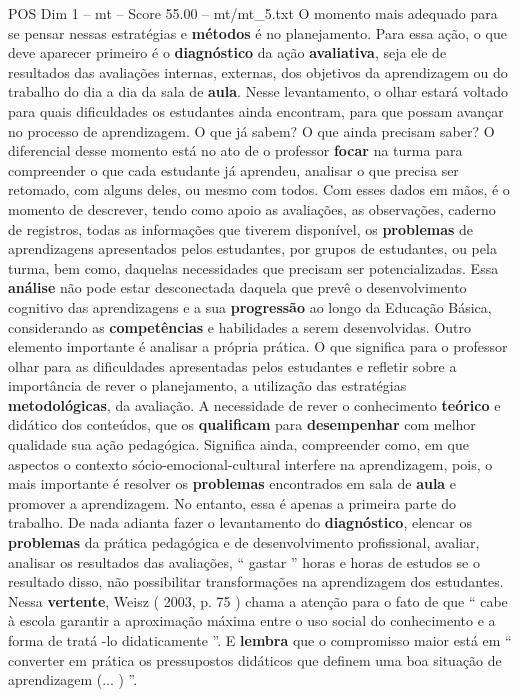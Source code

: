 \begin{textsample}{POS Dim 1 – mt – Score 55.00 – mt/mt\_5.txt}
O momento mais adequado para se pensar nessas estratégias e \textbf{métodos} é no planejamento.
Para essa ação, o que deve aparecer primeiro é o \textbf{diagnóstico} da ação \textbf{avaliativa}, seja ele de resultados das avaliações internas, externas, dos objetivos da aprendizagem ou do trabalho do dia a dia da sala de \textbf{aula}.
Nesse levantamento, o olhar estará voltado para quais dificuldades os estudantes ainda encontram, para que possam avançar no processo de aprendizagem.
O que já sabem?
O que ainda precisam saber?
O diferencial desse momento está no ato de o professor \textbf{focar} na turma para compreender o que cada estudante já aprendeu, analisar o que precisa ser retomado, com alguns deles, ou mesmo com todos.
Com esses dados em mãos, é o momento de descrever, tendo como apoio as avaliações, as observações, caderno de registros, todas as informações que tiverem disponível, os \textbf{problemas} de aprendizagens apresentados pelos estudantes, por grupos de estudantes, ou pela turma, bem como, daquelas necessidades que precisam ser potencializadas.
Essa \textbf{análise} não pode estar desconectada daquela que prevê o desenvolvimento cognitivo das aprendizagens e a sua \textbf{progressão} ao longo da Educação Básica, considerando as \textbf{competências} e habilidades a serem desenvolvidas.
Outro elemento importante é analisar a própria prática.
O que significa para o professor olhar para as dificuldades apresentadas pelos estudantes e refletir sobre a importância de rever o planejamento, a utilização das estratégias \textbf{metodológicas}, da avaliação.
A necessidade de rever o conhecimento \textbf{teórico} e didático dos conteúdos, que os \textbf{qualificam} para \textbf{desempenhar} com melhor qualidade sua ação pedagógica.
Significa ainda, compreender como, em que aspectos o contexto sócio-emocional-cultural interfere na aprendizagem, pois, o mais importante é resolver os \textbf{problemas} encontrados em sala de \textbf{aula} e promover a aprendizagem.
No entanto, essa é apenas a primeira parte do trabalho.
De nada adianta fazer o levantamento do \textbf{diagnóstico}, elencar os \textbf{problemas} da prática pedagógica e de desenvolvimento profissional, avaliar, analisar os resultados das avaliações, “ gastar ” horas e horas de estudos se o resultado disso, não possibilitar transformações na aprendizagem dos estudantes.
Nessa \textbf{vertente}, Weisz ( 2003, p. 75 ) chama a atenção para o fato de que “ cabe à escola garantir a aproximação máxima entre o uso social do conhecimento e a forma de tratá -lo didaticamente ”.
E \textbf{lembra} que o compromisso maior está em “ converter em prática os pressupostos didáticos que definem uma boa situação de aprendizagem (... ) ”.

\end{textsample}
